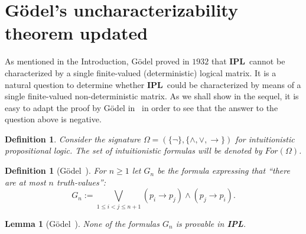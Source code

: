 \documentclass[12pt]{article}
\newtheorem{lemma}[theorem]{Lemma}
\newtheorem{definition}[theorem]{Definition}
\newcommand{\ipl}{\ensuremath{\mathbf{IPL}}}
\begin{document}


\section{G\"odel's uncharacterizability theorem updated}\label{sec3}

As mentioned in the Introduction, Gödel proved in $1932$  that \ipl\ cannot be characterized by a single finite-valued (deterministic) logical matrix. It is a natural question to determine whether \ipl\ could be characterized by means of a single finite-valued non-deterministic matrix. As we shall show in the sequel, it is easy to adapt the proof by G\"odel in~\cite{Godel1932} in order to see that the answer to the question above is negative.


\begin{definition} \label{int-sig}
    Consider the signature $\Omega =(\{ \neg \}, \{ \land, \lor, \rightarrow \} )$ for intuitionistic propositional logic. The set of intuitionistic formulas will be denoted by $For(\Omega)$.
\end{definition}

\begin{definition}  [G\"odel~\cite{Godel1932}]
For $n \geq 1$ let $G_n$ be the formula  expressing that ``there are at most $n$ truth-values'':
$$G_n := \bigvee_{1 \leq i < j \leq n+1} (p_i \to p_j) \land (p_j \to p_i).$$
\end{definition}



\begin{lemma} [G\"odel~\cite{Godel1932}] \label{lem-god-0}
None of the formulas $G_n$ is provable in \textbf{IPL}.
\end{lemma}
\end{document}
